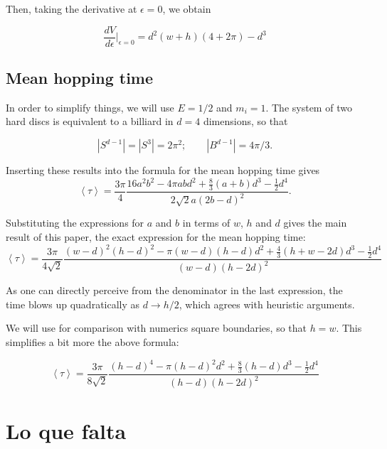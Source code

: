 \documentclass[letterpaper,12pt]{amsart}
\newcommand{\mean}[1]{\left \langle #1 \right \rangle}
\begin{document}
Then, taking the derivative at $\epsilon=0$, we obtain

\begin{equation}\label{Areaepsilon}
 \frac{dV}{d\epsilon} \vert_{\epsilon=0}
= d^2(w+h)(4+2\pi)-d^3
\end{equation}


\subsection{Mean hopping time}

In order to simplify things, we will use $E=1/2$ and $m_i=1$.
The system of two hard discs is equivalent to a billiard in $d=4$ dimensions, so that

\begin{equation}
 |S^{d-1}| = |S^3| = 2 \pi^2; \qquad |B^{d-1}| = 4 \pi / 3.
\end{equation}

Inserting these results into the formula for the mean hopping time gives
\begin{equation}
 \mean{\tau} = 	
\frac{3 \pi}{4}
\frac
{16 a^{2} b^{2}  - 4 \pi a b d^{2} + \textstyle \frac{8}{3} (a+b) d^{3}  - \frac{1}{2} d^{4}}
{ 2 \sqrt{2} a ( 2b - d )^2}.
\end{equation}

Substituting the expressions for $a$ and $b$ in terms of $w$, $h$ and $d$ gives
the main result of this paper, the exact expression for the mean hopping time:
\begin{equation}\label{hoptimegeneral}
 \mean{\tau} = \frac{3 \pi}{4 \sqrt{2}}
\frac{(w-d)^2(h-d)^2-\pi(w-d)(h-d)d^2+\frac{4}{3}(h+w-2d)d^3-\frac{1}{2}d^4}
{(w-d)(h-2d)^2}
\end{equation}

As one can directly perceive from the denominator in the last expression, the
time blows up quadratically as $d\rightarrow h/2$, which agrees
with heuristic arguments. 

We will use for comparison with numerics square boundaries, 
so that $h=w$. This simplifies a bit more the above 
formula:

\begin{equation}\label{hoptimesquare}
 \mean{\tau} =\frac{3\pi}{8\sqrt{2}} 
\frac{(h-d)^4-\pi(h-d)^2d^2+\frac{8}{3}(h-d)d^3-\frac{1}{2}d^4}
{(h-d)(h-2d)^2}
\end{equation}



\section{Lo que falta}
\end{document}
